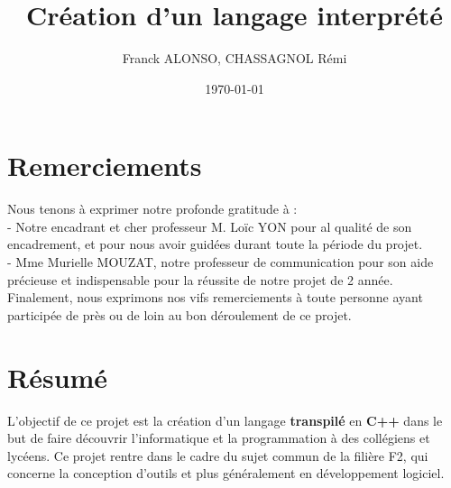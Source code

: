 \documentclass[a4paper]{article}%
\title{Création d'un langage interprété}
\author{Franck ALONSO, CHASSAGNOL Rémi}
\date{\today}
\begin{document}

\clearpage{}


\section*{Remerciements}

\doublespacing
\large %
Nous tenons à exprimer notre profonde gratitude à :\\
- Notre encadrant et cher professeur M. Loïc YON pour al qualité de son
  encadrement, et pour nous avoir guidées durant toute la période du projet.\\
- Mme Murielle MOUZAT, notre professeur de communication pour son aide précieuse
  et indispensable pour la réussite de notre projet de 2 année.\\

\noindent Finalement, nous exprimons nos vifs remerciements à toute personne
ayant participée de près ou de loin au bon déroulement de ce projet.

\normalsize
\onehalfspacing

\clearpage{}

\thispagestyle{empty}
\tableofcontents
\clearpage{}


\clearpage{}



\setcounter{secnumdepth}{0}
\section{Résumé}
L'objectif de ce projet est la création d'un langage \textbf{transpilé} en
\textbf{C++} dans le but de faire découvrir l'informatique et la programmation à
des collégiens et lycéens. Ce projet rentre dans le cadre du sujet commun de la
filière F2, qui concerne la conception d’outils et plus généralement en
développement logiciel.
\end{document}
